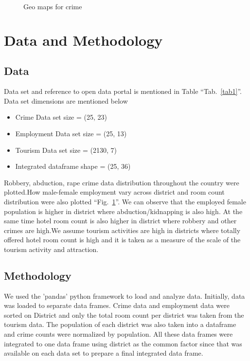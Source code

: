 \documentclass[conference]{IEEEtran}
\begin{document}
\begin{figure}[htbp]
  \centering
    \qquad
    \qquad
     \qquad
    \caption{Geo maps for crime}
  \label{fig_geo}
\end{figure}

\section{Data and Methodology}

\subsection{Data}
Data set and reference to open data portal is mentioned in Table ``Tab.~\ref{tab1}''. Data set dimensions are mentioned below
\begin{itemize}
    \item Crime Data set size =  (25, 23)
    \item Employment Data set size =  (25, 13)
    \item Tourism Data set size =  (2130, 7)
    \item Integrated dataframe shape =  (25, 36)
\end{itemize}
Robbery, abduction, rape crime data distribution throughout the country were plotted.How male-female employment vary across district and room count distribution were also plotted ``Fig.~\ref{fig_geo}''. We can observe that the employed female population is higher in district where abduction/kidnapping is also high. At the same time hotel room count is also higher in district where robbery and other crimes are high.We assume tourism activities are high in districts where totally offered hotel room count is high and it is taken as a measure of the scale of the tourism activity and attraction.  


\subsection{Methodology}
We used the 'pandas' python framework to load and analyze data. Initially, data was loaded to separate data frames. Crime data and employment data were sorted on District and only the total room count per district was taken from the tourism data. The population of each district was also taken into a dataframe and crime counts were normalized by population. All these data frames were integrated to one data frame using district as the common factor since that was available on each data set to prepare a final integrated data frame.
\end{document}
